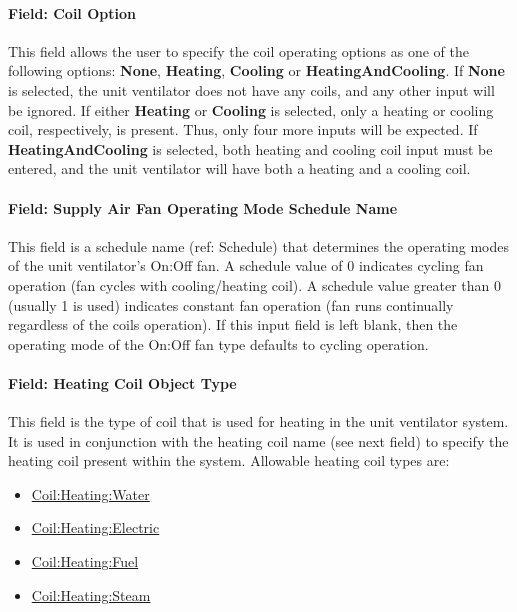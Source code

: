 \paragraph{Field: Coil Option}\label{field-coil-option}

This field allows the user to specify the coil operating options as one of the following options: \textbf{None}, \textbf{Heating}, \textbf{Cooling} or \textbf{HeatingAndCooling}. If \textbf{None} is selected, the unit ventilator does not have any coils, and any other input will be ignored. If either \textbf{Heating} or \textbf{Cooling} is selected, only a heating or cooling coil, respectively, is present. Thus, only four more inputs will be expected. If \textbf{HeatingAndCooling} is selected, both heating and cooling coil input must be entered, and the unit ventilator will have both a heating and a cooling coil.

\paragraph{Field: Supply Air Fan Operating Mode Schedule Name}\label{field-supply-air-fan-operating-mode-schedule-name-1-000}

This field is a schedule name (ref: Schedule) that determines the operating modes of the unit ventilator's On:Off fan. A schedule value of 0 indicates cycling fan operation (fan cycles with cooling/heating coil). A schedule value greater than 0 (usually 1 is used) indicates constant fan operation (fan runs continually regardless of the coils operation). If this input field is left blank, then the operating mode of the On:Off fan type defaults to cycling operation.

\paragraph{Field: Heating Coil Object Type}\label{field-heating-coil-object-type-1-001}

This field is the type of coil that is used for heating in the unit ventilator system. It is used in conjunction with the heating coil name (see next field) to specify the heating coil present within the system. Allowable heating coil types are:

\begin{itemize}
\item
  \hyperref[coilheatingwater]{Coil:Heating:Water}
\item
  \hyperref[coilheatingelectric]{Coil:Heating:Electric}
\item
  \hyperref[coilheatinggas-000]{Coil:Heating:Fuel}
\item
  \hyperref[coilheatingsteam]{Coil:Heating:Steam}
\end{itemize}

